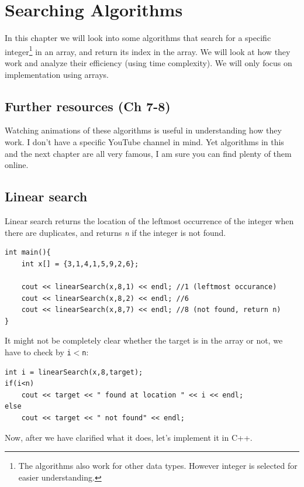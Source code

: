 \chapter{Searching Algorithms}

In this chapter we will look into some algorithms that search for a specific integer\footnote{The algorithms also work for other data types. However integer is selected for easier understanding.} in an array, and return its index in the array. We will look at how they work and analyze their efficiency (using time complexity). We will only focus on implementation using arrays.

\section{Further resources (Ch 7-8)}

Watching animations of these algorithms is useful in understanding how they work. I don't have a specific YouTube channel in mind. Yet algorithms in this and the next chapter are all very famous, I am sure you can find plenty of them online.

\section{Linear search}

Linear search returns the location of the leftmost occurrence of the integer when there are duplicates, and returns \textit{n} if the integer is not found.

\begin{lstlisting}
int main(){
    int x[] = {3,1,4,1,5,9,2,6};

    cout << linearSearch(x,8,1) << endl; //1 (leftmost occurance)
    cout << linearSearch(x,8,2) << endl; //6
    cout << linearSearch(x,8,7) << endl; //8 (not found, return n)
}
\end{lstlisting}

It might not be completely clear whether the target is in the array or not, we have to check by \texttt{i$<$n}:

\begin{lstlisting}
int i = linearSearch(x,8,target);
if(i<n)
    cout << target << " found at location " << i << endl;
else 
    cout << target << " not found" << endl;
\end{lstlisting}

Now, after we have clarified what it does, let's implement it in C++.
\vspace{6mm}

